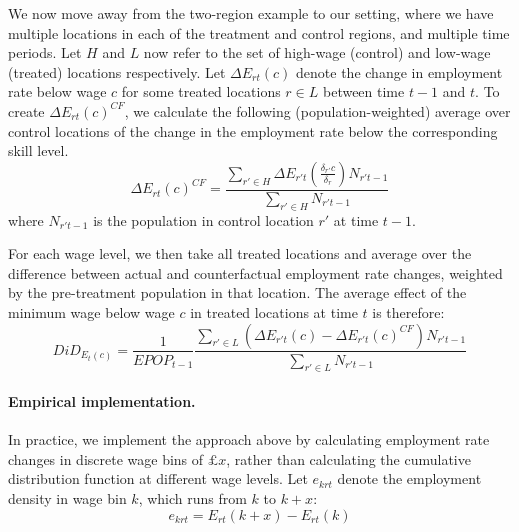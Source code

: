We now move away from the two-region example to our setting, where we have multiple locations in each of the treatment and control regions, and multiple time periods. Let $H$ and $L$ now refer to the set of high-wage (control) and low-wage (treated) locations respectively. Let $\Delta E_{rt}(c)$ denote the change in employment rate below wage $c$ for some treated locations $r \in L$ between time $t-1$ and $t$. To create $\Delta E_{rt}(c)^{CF}$, we calculate the following (population-weighted) average over control locations of the change in the employment rate below the corresponding skill level.
\begin{equation} \label{eq:average_control_regions}
    \Delta E_{rt}(c)^{CF} = \frac{\sum_{r'\in H}\Delta E_{r't}\left(\frac{\delta_{r'}c}{\delta_{r}}\right)N_{r't-1}}{\sum_{r'\in H}N_{r't-1}} 
\end{equation}
where $N_{r't-1}$ is the population in control location $r'$ at time $t-1$.

For each wage level, we then take all treated locations and average over the difference between actual and counterfactual employment rate changes, weighted by the pre-treatment population in that location. The average effect of the minimum wage below wage $c$ in treated locations at time $t$ is therefore:
\begin{equation} \label{eq:average_region}
    DiD_{E_t(c)}  =\frac{1}{EPOP_{t-1}}{\frac{\sum_{r'\in L}(\Delta E_{r't}(c) - \Delta E_{r't}(c)^{CF})N_{r't-1}}{\sum_{r'\in L}N_{r't-1}}}
\end{equation}

\paragraph{Empirical implementation.} In practice, we implement the approach above by calculating employment rate changes in discrete wage bins of $\pounds x$, rather than calculating the cumulative distribution function at different wage levels. Let $e_{krt}$ denote the employment density in wage bin $k$, which runs from $k$ to $k+x$:
\begin{equation} \label{eq:wage_bin}
    e_{krt} = E_{rt}(k+x) - E_{rt}(k)
\end{equation}

